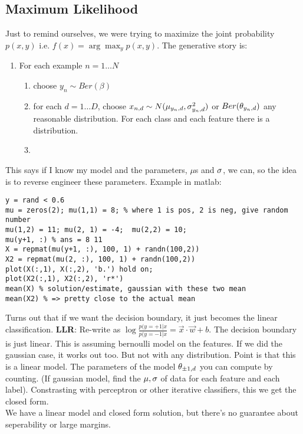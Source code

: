 \subsection{Maximum Likelihood}
\label{sec:maxli}

Just to remind ourselves, we were trying to maximize the joint
probability $p(x,y)$ i.e. $f(x) = \arg\max_y p(x,y)$.
The generative story is:
\begin{enumerate}
\item For each example $n=1\dots N$
  \begin{enumerate}
  \item choose $y_n\sim Ber(\beta)$
  \item for each $d=1\dots D$, choose $x_{n,d} \sim N(\mu_{y_n,d},
    \sigma_{y_n,d}^2)$ or $Ber(\theta_{y_n,d})$ any reasonable
    distribution. For each class and each feature there is a
    distribution.
  \item 
  \end{enumerate}
\end{enumerate}
This says if I know my model and the parameters, $\mu$s and $\sigma$, we can, so the idea
is to reverse engineer these parameters.
Example in matlab:
\begin{verbatim}
y = rand < 0.6
mu = zeros(2); mu(1,1) = 8; % where 1 is pos, 2 is neg, give random number
mu(1,2) = 11; mu(2, 1) = -4;  mu(2,2) = 10;
mu(y+1, :) % ans = 8 11 
X = repmat(mu(y+1, :), 100, 1) + randn(100,2))
X2 = repmat(mu(2, :), 100, 1) + randn(100,2))
plot(X(:,1), X(:,2), 'b.') hold on;
plot(X2(:,1), X2(:,2), 'r*')
mean(X) % solution/estimate, gaussian with these two mean 
mean(X2) % => pretty close to the actual mean 
\end{verbatim}

Turns out that if we want the decision boundary, it just becomes the
linear classification. 
\textbf{LLR}: 
Re-write as $\log \frac{p(y=+1|x}{p(y=-1|x} = \vec x \cdot \vec w +
b$. The decision boundary is just linear. This is assuming bernoulli
model on the features. If we did the gaussian case, it works out
too. But not with any distribution. Point is that this is a linear
model. The parameters of the model $\theta_{\pm 1, d}$ you can  compute
by counting. (If gaussian model, find the $\mu,\sigma$ of data for each
feature and each label). Constrasting with perceptron or other iterative
classifiers, this we get the closed form.\\
We have a linear model and closed form solution, but there's no
guarantee about seperability or large margins.

